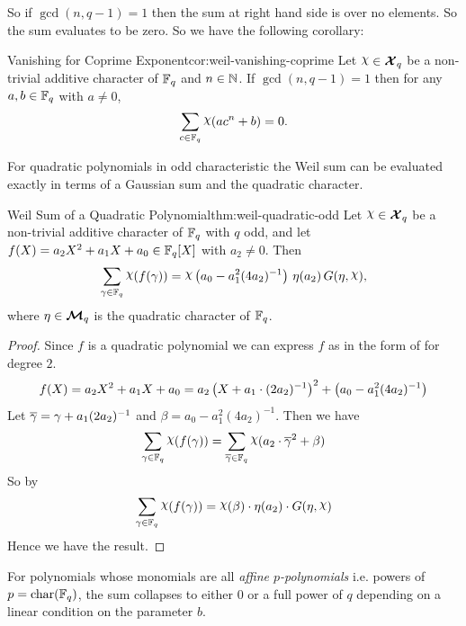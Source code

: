 So if $\gcd(n,q-1)=1$ then the sum at right hand side is over no elements. So the sum evaluates to be zero. So we have the following corollary:
\begin{corolary}{Vanishing for Coprime Exponent}{cor:weil-vanishing-coprime}
  Let $\chi\in\Xq$ be a non-trivial additive character of $\mathbb{F}_q$ and $n\in\mathbb{N}$. If $\gcd(n,q-1)=1$ then for any $a,b\in\mathbb{F}_q$ with $a\neq 0$,
  $$\sum_{c\in\bbF_q}\chi(ac^n+b)=0.$$
\end{corolary}

For quadratic polynomials in odd characteristic the Weil sum can be evaluated exactly in terms of a Gaussian sum and the quadratic character. 

\begin{Theorem}{Weil Sum of a Quadratic Polynomial}{thm:weil-quadratic-odd}
  Let $\chi\in\Xq$ be a non-trivial additive character of $\mathbb{F}_q$ with $q$ odd, and let $f(X)=a_2X^2+a_1X+a_0\in\mathbb{F}_q[X]$ with $a_2\neq 0$. Then
  $$\sum_{\gm\in\bbF_q}\chi(f(\gm))=\chi\lt(a_0-a_1^2(4a_2)^{-1}\rt)\,\eta(a_2)\,G(\eta,\chi),$$
  where $\eta\in\boldsymbol{\mathcal{M}}_q$ is the quadratic character of $\mathbb{F}_q$.
\end{Theorem}
\begin{proof}
  Since $f$ is a quadratic polynomial we can express $f$ as in the form of  for degree $2$. $$f(X)=a_2X^2+a_1X+a_0=a_2\left(X+a_1\cdot (2a_2)^{-1}\right)^2+\left(a_0-a_1^2(4a_2)^{-1}\right)$$Let $\overline{\gamma}=\gamma+a_1(2a_2)^{-1}$ and $\beta=a_0-a_1^2(4a_2)^{-1}$. Then we have $$\sum_{\gm\in\bbF_q}\chi(f(\gm))=\sum_{\ov{\gm}\in\bbF_q}\chi(a_2\cdot \ov{\gm}^2+\beta)$$So by $$\sum_{\gm\in\bbF_q}\chi(f(\gm))=\chi(\beta)\cdot \eta(a_2)\cdot G(\eta,\chi)$$Hence we have the result. 
\end{proof}
For polynomials whose monomials are all \emph{affine $p$-polynomials} i.e. powers of $p = \operatorname{char}(\mathbb{F}_q)$, the sum collapses to either $0$ or a full power of $q$ depending on a linear condition on the parameter $b$.

